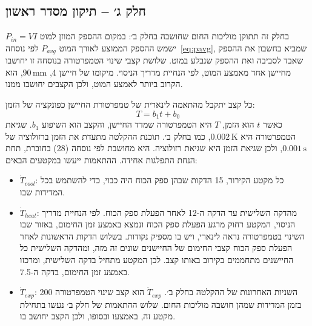 \documentclass[10pt,a4paper]{article}
\newcommand{\U}[1]{\,\mathrm{#1}}
\begin{document}
\subsection*{חלק ג׳ -- תיקון מסדר ראשון}
בחלק זה תתוקן מוליכות החום שחושבה בחלק ב׳: במקום ההספק המוזן למוט $P_{in} = VI$ ישמש ההספק הממוצע לאורך המוט $P_{avg}$ לפי נוסחה~\eqref{eq:pavg}, שמביא בחשבון את ההספק שאבד לסביבה ואת ההספק שנבלע במוט. שלושת קצבי שינוי הטמפרטורה בנוסחה זו יחושבו מחיישן אחד מאמצע המוט, לפי הנחיית מדריך הניסוי. מיקומו של חיישן 4, $90\U{mm}$, הוא הקרוב ביותר לאמצע המוט, ולכן הקצבים יחושבו ממנו.

כל קצב יתקבל מהתאמה לינארית של טמפרטורת החיישן כפונקציה של הזמן:
\begin{equation}\label{eq:fitc}
T = b_1 t + b_0
\end{equation}
כאשר $t$ הוא הזמן, $T$ היא הטמפרטורה שמדד החיישן, והקצב הוא השיפוע $b_1$. שגיאת הטמפרטורה היא $0.002\U{K}$, כמו בחלק ב׳. תוכנת ההקלטה מתעדת את הזמן ברזולוציה של $0.001\U{s}$, ולכן שגיאת הזמן היא שגיאת רזולוציה. היא מחושבת לפי נוסחה (28) בחוברת, תחת הנחת התפלגות אחידה. ההתאמות ייעשו במקטעים הבאים:
\begin{itemize}\setlength{\itemsep}{0pt}\setlength{\parskip}{0pt}
  \item $\dot{T}_{cool}$: כל מקטע הקירור, 15 הדקות שבהן ספק הכוח היה כבוי, כדי להשתמש בכל המדידות שבו.
  \item $\dot{T}_{heat}$: מהדקה השלישית עד הדקה ה-12 לאחר הפעלת ספק הכוח. לפי הנחיית מדריך הניסוי, המקטע רחוק מרגע הפעלת ספק הכוח ונמצא באמצע זמן החימום, באזור שבו השינוי בטמפרטורה נראה לינארי, ויש בו מספיק נקודות. בשלוש הדקות הראשונות לאחר הפעלת ספק הכוח קצבי החימום של החיישנים שונים זה מזה, ומהדקה השלישית כל החיישנים מתחממים בקירוב באותו קצב. לכן המקטע מתחיל בדקה השלישית, ומרכזו באמצע זמן החימום, בדקה ה-7.5.
  \item $\dot{T}_{exp}$: 200 השניות האחרונות של ההקלטה בחלק ב׳. $\dot{T}_{exp}$ הוא קצב שינוי הטמפרטורה בזמן המדידות שמהן חושבה מוליכות החום. שלוש ההתאמות של חלק ב׳ נעשו בתחילת מקטע זה, באמצעו ובסופו, ולכן הקצב יחושב בו.
\end{itemize}
\end{document}
